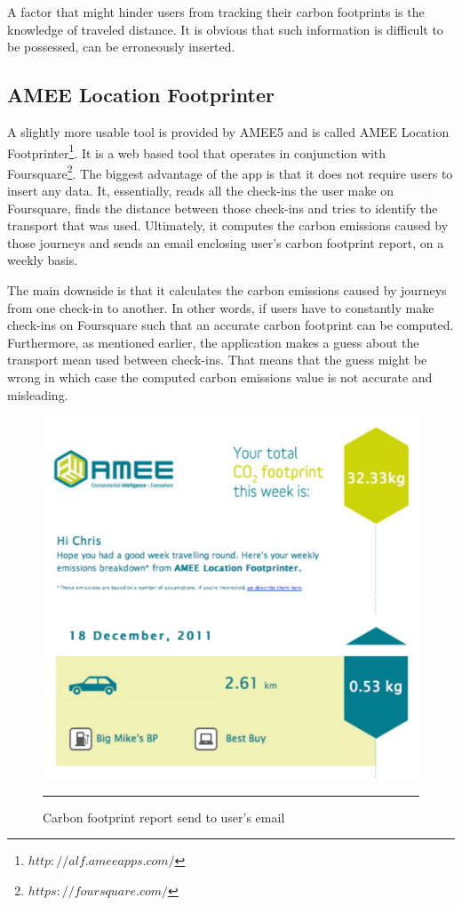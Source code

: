 A factor that might hinder users from tracking their carbon footprints is the knowledge of traveled distance. It is obvious that such information is difficult to be possessed, can be erroneously inserted.

\subsection{AMEE Location Footprinter}

A slightly more usable tool is provided by AMEE5 and is called AMEE Location Footprinter\footnote{$http://alf.ameeapps.com/$}. It is a web based tool that operates in conjunction with Foursquare\footnote{$https://foursquare.com/$}. The biggest advantage of the app is that it does not require users to insert any data. It, essentially, reads all the check-ins the user make on Foursquare, finds the distance between those check-ins and tries to identify the transport that was used. Ultimately, it computes the carbon emissions caused by those journeys and sends an email enclosing user's carbon footprint report, on a weekly basis.

The main downside is that it calculates the carbon emissions caused by journeys from one check-in to another. In other words, if users have to constantly make check-ins on Foursquare such that an accurate carbon footprint can be computed. Furthermore, as mentioned earlier, the application makes a guess about the transport mean used between check-ins. That means that the guess might be wrong in which case the computed carbon emissions value is not accurate and misleading.

\begin{figure}[htbp]
	\centering
		\includegraphics[scale=0.70]{./Figures/chapter2/figure20.pdf}
		\rule{35em}{0.5pt}
	\caption[Carbon footprint report send to user's email]{Carbon footprint report send to user's email}
	\label{fig:ameeLocationFootprinter}
\end{figure}


